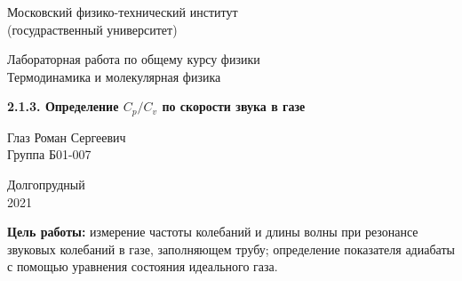 \documentclass[a4paper, 12pt]{article} %
\begin{document}


\begin{titlepage}

    \newpage
    \begin{center}
        \normalsize Московский физико-технический институт \\(госудраственный университет)
    \end{center}

    \vspace{6em}

    \begin{center}
        \Large Лабораторная работа по общему курсу физики\\Термодинамика и молекулярная физика
    \end{center}

    \vspace{1em}

    \begin{center}
        \Large \textbf{2.1.3. Определение $C_p/C_v$ по скорости звука в газе}
    \end{center}

    \vspace{2em}

    \begin{center}
        \large Глаз Роман Сергеевич\\
        Группа Б01-007
    \end{center}

    \vspace{\fill}

    \begin{center}
    Долгопрудный \\2021
    \end{center}
    
\end{titlepage}



    \thispagestyle{empty}
    \newpage
    \tableofcontents
    \newpage
    \setcounter{page}{1}


                    
\textbf{Цель работы:} измерение частоты
    колебаний
    и длины волны при
    резонансе звуковых
    колебаний в газе, заполняющем трубу; определение показателя адиабаты с помощью уравнения состояния идеального газа.\\
\end{document}
